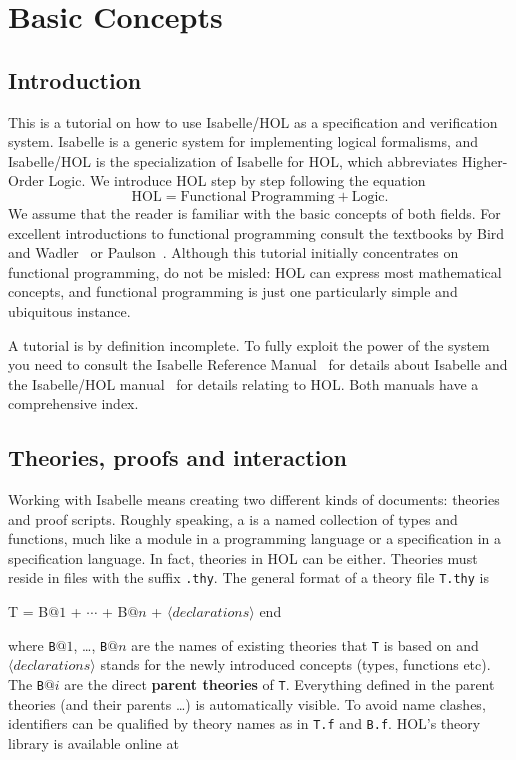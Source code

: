 \chapter{Basic Concepts}

\section{Introduction}

This is a tutorial on how to use Isabelle/HOL as a specification and
verification system. Isabelle is a generic system for implementing logical
formalisms, and Isabelle/HOL is the specialization of Isabelle for
HOL, which abbreviates Higher-Order Logic. We introduce HOL step by step
following the equation
\[ \mbox{HOL} = \mbox{Functional Programming} + \mbox{Logic}. \]
We assume that the reader is familiar with the basic concepts of both fields.
For excellent introductions to functional programming consult the textbooks
by Bird and Wadler~\cite{Bird-Wadler} or Paulson~\cite{paulson-ml2}.  Although
this tutorial initially concentrates on functional programming, do not be
misled: HOL can express most mathematical concepts, and functional
programming is just one particularly simple and ubiquitous instance.

A tutorial is by definition incomplete. To fully exploit the power of the
system you need to consult the Isabelle Reference Manual~\cite{isabelle-ref}
for details about Isabelle and the Isabelle/HOL manual~\cite{isabelle-HOL}
for details relating to HOL. Both manuals have a comprehensive index.

\section{Theories, proofs and interaction}
\label{sec:Basic:Theories}

Working with Isabelle means creating two different kinds of documents:
theories and proof scripts. Roughly speaking, a  is a named
collection of types and functions, much like a module in a programming
language or a specification in a specification language. In fact, theories in
HOL can be either. Theories must reside in files with the suffix
\texttt{.thy}. The general format of a theory file \texttt{T.thy} is
\begin{ttbox}
T = B\(@1\) + \(\cdots\) + B\(@n\) +
\({\langle}declarations{\rangle}\)
end
\end{ttbox}
where \texttt{B}$@1$, \dots, \texttt{B}$@n$ are the names of existing
theories that \texttt{T} is based on and ${\langle}declarations{\rangle}$ stands for the
newly introduced concepts (types, functions etc). The \texttt{B}$@i$ are the
direct \textbf{parent theories} of \texttt{T}.
Everything defined in the parent theories (and their parents \dots) is
automatically visible. To avoid name clashes, identifiers can be qualified by
theory names as in \texttt{T.f} and \texttt{B.f}. HOL's theory library is
available online at

